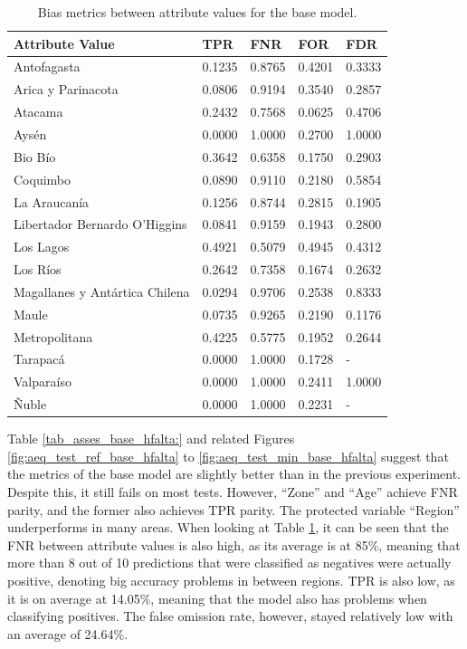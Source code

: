 \documentclass[twoside,11pt]{article}
\begin{document}
\begin{table}[!htb]
\centering
\begin{tabular}{|p{3.5cm}|p{1cm}|p{1cm}|p{1cm}|p{1cm}|}
\hline

        \textbf{Attribute Value} &    \textbf{TPR} &    \textbf{FNR} &    \textbf{FOR} &    \textbf{FDR} \\
\hline
                   Antofagasta & 0.1235 & 0.8765 & 0.4201 & 0.3333 \\
            Arica y Parinacota & 0.0806 & 0.9194 & 0.3540 & 0.2857 \\
                       Atacama & 0.2432 & 0.7568 & 0.0625 & 0.4706 \\
                         Aysén & 0.0000 & 1.0000 & 0.2700 & 1.0000 \\
                       Bio Bío & 0.3642 & 0.6358 & 0.1750 & 0.2903 \\
                      Coquimbo & 0.0890 & 0.9110 & 0.2180 & 0.5854 \\
                  La Araucanía & 0.1256 & 0.8744 & 0.2815 & 0.1905 \\
 Libertador Bernardo O'Higgins & 0.0841 & 0.9159 & 0.1943 & 0.2800 \\
                     Los Lagos & 0.4921 & 0.5079 & 0.4945 & 0.4312 \\
                      Los Ríos & 0.2642 & 0.7358 & 0.1674 & 0.2632 \\
Magallanes y Antártica Chilena & 0.0294 & 0.9706 & 0.2538 & 0.8333 \\
                         Maule & 0.0735 & 0.9265 & 0.2190 & 0.1176 \\
                 Metropolitana & 0.4225 & 0.5775 & 0.1952 & 0.2644 \\
                      Tarapacá & 0.0000 & 1.0000 & 0.1728 &    - \\
                    Valparaíso & 0.0000 & 1.0000 & 0.2411 & 1.0000 \\
                         Ñuble & 0.0000 & 1.0000 & 0.2231 &    - \\

\hline
\end{tabular}
\caption{Bias metrics between attribute values for the base model.}
\label{tab_region_hfalta_base:}
\end{table}

Table \ref{tab_asses_base_hfalta:} and related Figures \ref{fig:aeq_test_ref_base_hfalta} to \ref{fig:aeq_test_min_base_hfalta} suggest that the metrics of the base model are slightly better than in the previous experiment. Despite this, it still fails on most tests. However, ``Zone'' and ``Age'' achieve FNR parity, and the former also achieves TPR parity. The protected variable ``Region'' underperforms in many areas. When looking at Table \ref{tab_region_hfalta_base:}, it can be seen that the FNR between attribute values is also high, as its average is at 85\%, meaning that more than 8 out of 10 predictions that were classified as negatives were actually positive, denoting big accuracy problems in between regions. TPR is also low, as it is on average at 14.05\%, meaning that the model also has problems when classifying positives. The false omission rate, however, stayed relatively low with an average of 24.64\%.
\end{document}
